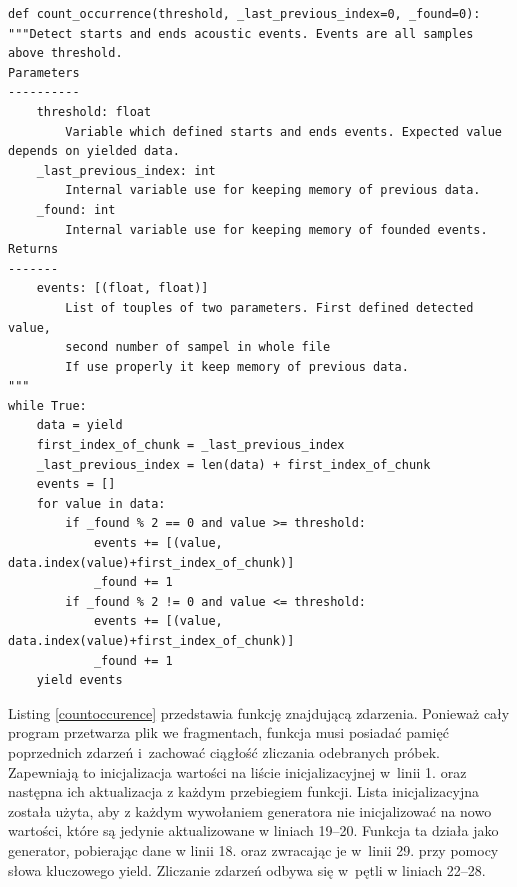 \documentclass[eng,printmode]{mgr}
\begin{document}
\begin{minipage}{\linewidth}
\begin{lstlisting}[caption={Fragment kodu źródłowego pliku Detectors.py,\newline klasa ThresholdCrossDetector, metoda count\_occurrence},captionpos=b,label={countoccurence}]     
    def count_occurrence(threshold, _last_previous_index=0, _found=0):
"""Detect starts and ends acoustic events. Events are all samples above threshold.
Parameters
----------
    threshold: float
        Variable which defined starts and ends events. Expected value depends on yielded data.
    _last_previous_index: int
        Internal variable use for keeping memory of previous data.
    _found: int
        Internal variable use for keeping memory of founded events.
Returns
-------
    events: [(float, float)]
        List of touples of two parameters. First defined detected value,
        second number of sampel in whole file
        If use properly it keep memory of previous data.
"""
while True:
    data = yield
    first_index_of_chunk = _last_previous_index
    _last_previous_index = len(data) + first_index_of_chunk
    events = []
    for value in data:
        if _found % 2 == 0 and value >= threshold:
            events += [(value, data.index(value)+first_index_of_chunk)]
            _found += 1
        if _found % 2 != 0 and value <= threshold:
            events += [(value, data.index(value)+first_index_of_chunk)]
            _found += 1
    yield events
\end{lstlisting}
\end{minipage}

Listing \ref{countoccurence} przedstawia funkcję znajdującą zdarzenia. Ponieważ cały program przetwarza plik we fragmentach, funkcja musi posiadać pamięć poprzednich zdarzeń i~zachować ciągłość zliczania odebranych próbek. Zapewniają to inicjalizacja wartości na liście inicjalizacyjnej w~linii  1. oraz następna ich aktualizacja z każdym przebiegiem funkcji. Lista inicjalizacyjna została użyta, aby z każdym wywołaniem generatora nie inicjalizować na nowo wartości, które są jedynie aktualizowane w liniach 19--20. Funkcja ta działa jako generator, pobierając dane w linii 18. oraz zwracając je w~linii 29. przy pomocy słowa kluczowego yield. Zliczanie zdarzeń odbywa się w~pętli w liniach 22--28.
\end{document}

